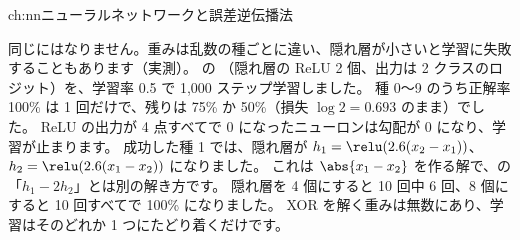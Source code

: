 \begin{answers}{ch:nn}{ニューラルネットワークと誤差逆伝播法}
\item 同じにはなりません。重みは乱数の種ごとに違い、隠れ層が小さいと学習に失敗することもあります（実測）。
 の （隠れ層の ReLU 2 個、出力は 2 クラスのロジット）を、学習率 0.5 で 1,000 ステップ学習しました。
種 0〜9 のうち正解率 100\% は 1 回だけで、残りは 75\% か 50\%（損失 $\log 2=0.693$ のまま）でした。
ReLU の出力が 4 点すべてで 0 になったニューロンは勾配が 0 になり、学習が止まります。
成功した種 1 では、隠れ層が $h_1=\relu(2.6(x_2-x_1))$、$h_2=\relu(2.6(x_1-x_2))$ になりました。
これは $\abs{x_1-x_2}$ を作る解で、の「$h_1-2h_2$」とは別の解き方です。
隠れ層を 4 個にすると 10 回中 6 回、8 個にすると 10 回すべてで 100\% になりました。
XOR を解く重みは無数にあり、学習はそのどれか 1 つにたどり着くだけです。
\end{answers}
